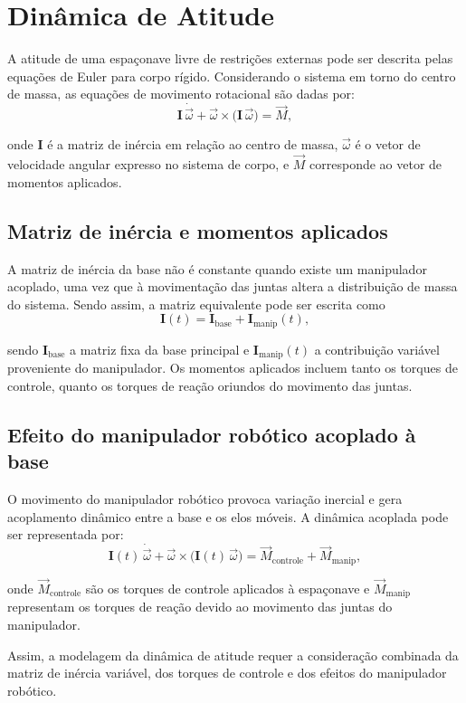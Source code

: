\section{Dinâmica de Atitude}
A atitude de uma espaçonave livre de restrições externas pode ser descrita pelas equações de Euler para corpo rígido.
Considerando o sistema em torno do centro de massa, as equações de movimento rotacional são dadas por:
\begin{equation}
\mathbf{I}\,\dot{\vec{\omega}} + \vec{\omega} \times \big(\mathbf{I}\,\vec{\omega}\big) = \vec{M},
\label{eq:euler_rigidbody}
\end{equation}

onde $\mathbf{I}$ é a matriz de inércia em relação ao centro de massa, $\vec{\omega}$ é o vetor de velocidade angular expresso no sistema de corpo, e $\vec{M}$ corresponde ao vetor de momentos aplicados.

\subsection{Matriz de inércia e momentos aplicados}
A matriz de inércia da base não é constante quando existe um manipulador acoplado, uma vez que à movimentação das juntas altera a distribuição de massa do sistema.
Sendo assim, a matriz equivalente pode ser escrita como
\begin{equation}
\mathbf{I}(t) = \mathbf{I}_{\text{base}} + \mathbf{I}_{\text{manip}}(t),
\label{eq:inercia_total}
\end{equation}

sendo $\mathbf{I}_{\text{base}}$ a matriz fixa da base principal e $\mathbf{I}_{\text{manip}}(t)$ a contribuição variável proveniente do manipulador.  
Os momentos aplicados incluem tanto os torques de controle, quanto os torques de reação oriundos do movimento das juntas.

\subsection{Efeito do manipulador robótico acoplado à base}
O movimento do manipulador robótico provoca variação inercial e gera acoplamento dinâmico entre a base e os elos móveis.
A dinâmica acoplada pode ser representada por:
\begin{equation}
\mathbf{I}(t)\,\dot{\vec{\omega}} + \vec{\omega} \times \big(\mathbf{I}(t)\,\vec{\omega}\big) = \vec{M}_{\text{controle}} + \vec{M}_{\text{manip}},
\label{eq:dinamica_acoplada}
\end{equation}

onde $\vec{M}_{\text{controle}}$ são os torques de controle aplicados à espaçonave e $\vec{M}_{\text{manip}}$ representam os torques de reação devido ao movimento das juntas do manipulador.

Assim, a modelagem da dinâmica de atitude requer a consideração combinada da matriz de inércia variável, dos torques de controle e dos efeitos do manipulador robótico.
